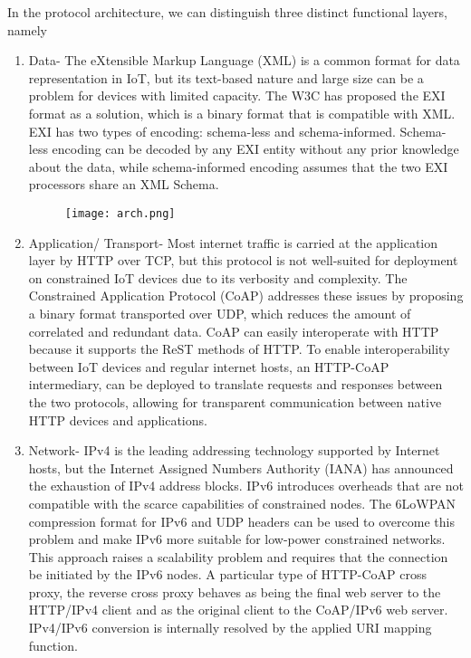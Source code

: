 \documentclass{article}
\begin{document}
In the protocol architecture, we can distinguish three distinct functional layers, namely 
\begin{enumerate}
\item Data- The eXtensible Markup Language (XML) is a common format for data representation in IoT, but its text-based nature and large size can be a problem for devices with limited capacity. The W3C has proposed the EXI format as a solution, which is a binary format that is compatible with XML. EXI has two types of encoding: schema-less and schema-informed. Schema-less encoding can be decoded by any EXI entity without any prior knowledge about the data, while schema-informed encoding assumes that the two EXI processors share an XML Schema.
\begin{figure}[h]
\texttt{[image: arch.png]}
\end{figure}
\item Application/ Transport- Most internet traffic is carried at the application layer by HTTP over TCP, but this protocol is not well-suited for deployment on constrained IoT devices due to its verbosity and complexity. The Constrained Application Protocol (CoAP) addresses these issues by proposing a binary format transported over UDP, which reduces the amount of correlated and redundant data. CoAP can easily interoperate with HTTP because it supports the ReST methods of HTTP. To enable interoperability between IoT devices and regular internet hosts, an HTTP-CoAP intermediary, can be deployed to translate requests and responses between the two protocols, allowing for transparent communication between native HTTP devices and applications.
\item Network- IPv4 is the leading addressing technology supported by Internet hosts, but the Internet Assigned Numbers Authority (IANA) has announced the exhaustion of IPv4 address blocks. IPv6 introduces overheads that are not compatible with the scarce capabilities of constrained nodes. The 6LoWPAN compression format for IPv6 and UDP headers can be used to overcome this problem and make IPv6 more suitable for low-power constrained networks. This approach raises a scalability problem and requires that the connection be initiated by the IPv6 nodes. A particular type of HTTP-CoAP cross proxy, the reverse cross
proxy behaves as being the final web server to the HTTP/IPv4 client and as the original client to the CoAP/IPv6 web server. IPv4/IPv6 conversion is internally resolved by the applied URI mapping function.
\end{enumerate}
\end{document}
